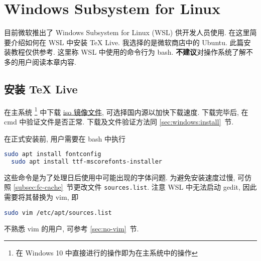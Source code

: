 
\chapter{Windows Subsystem for Linux}

目前微软推出了 Windows Subsystem for Linux (WSL) 供开发人员使用.
在这里简要介绍如何在 WSL 中安装 \TeX{} Live.
我选择的是微软商店中的 Ubuntu.
此篇安装教程仅供参考.
这里称 WSL 中使用的命令行为 \textsf{bash}.
\textbf{不建议}对操作系统了解不多的用户阅读本章内容.

\section{安装 \TeX{} Live}

在主系统%
\footnote{在 Windows 10 中直接进行的操作即为在主系统中的操作}%
中下载
\href{https://mirrors.ctan.org/systems/texlive/Images/texlive2022.iso}{iso 镜像文件},
可选择国内源以加快下载速度.
下载完毕后, 在 \textsf{cmd} 中验证文件是否正常.
下载及文件验证方法同 \ref{sec:windows:install}~节.

在正式安装前,
用户需要在 \textsf{bash} 中执行
\begin{lstlisting}[language=bash]
  sudo apt install fontconfig
  sudo apt install ttf-mscorefonts-installer
\end{lstlisting}
这些命令是为了处理日后使用中可能出现的字体问题.
为避免安装速度过慢,
可仿照 \ref{subsec:fc-cache}~节更改文件 \texttt{sources.list}.
注意 WSL 中无法启动 \textsf{gedit},
因此需要将其替换为 \textsf{vim},
即
\begin{lstlisting}[language=bash]
  sudo vim /etc/apt/sources.list
\end{lstlisting}
不熟悉 \textsf{vim} 的用户,
可参考 \ref{sec:no-vim}~节.

